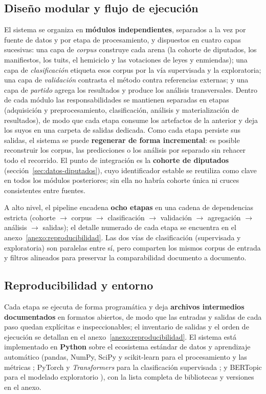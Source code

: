 \subsection{Diseño modular y flujo de ejecución}
\label{sec:arq-modular}

El sistema se organiza en \textbf{módulos independientes}, separados a la vez por
fuente de datos y por etapa de procesamiento, y dispuestos en cuatro capas
sucesivas: una capa de \emph{corpus} construye cada arena (la cohorte de
diputados, los manifiestos, los tuits, el hemiciclo y las votaciones de leyes y
enmiendas); una capa de \emph{clasificación} etiqueta esos corpus por la vía
supervisada y la exploratoria; una capa de \emph{validación} contrasta el método
contra referencias externas; y una capa de \emph{partido} agrega los resultados y
produce los análisis transversales. Dentro de cada módulo las responsabilidades
se mantienen separadas en etapas (adquisición y preprocesamiento, clasificación,
análisis y materialización de resultados), de modo que cada etapa consume los
artefactos de la anterior y deja los suyos en una carpeta de salidas dedicada.
Como cada etapa persiste sus salidas, el sistema se puede \textbf{regenerar de
forma incremental}: es posible reconstruir los corpus, las predicciones o los
análisis por separado sin rehacer todo el recorrido. El punto de integración es
la \textbf{cohorte de diputados} (sección~\ref{sec:datos-diputados}), cuyo
identificador estable se reutiliza como clave en todos los módulos posteriores;
sin ella no habría cohorte única ni cruces consistentes entre fuentes.

A alto nivel, el pipeline encadena \textbf{ocho etapas} en una cadena de
dependencias estricta (cohorte $\rightarrow$ corpus $\rightarrow$ clasificación
$\rightarrow$ validación $\rightarrow$ agregación $\rightarrow$ análisis
$\rightarrow$ salidas); el detalle numerado de cada etapa se encuentra en el
anexo~\ref{anexo:reproducibilidad}. Las dos vías de clasificación (supervisada
y exploratoria) son paralelas entre sí, pero comparten los mismos corpus de
entrada y filtros alineados para preservar la comparabilidad documento a
documento.

\subsection{Reproducibilidad y entorno}
\label{sec:arq-reproducibilidad}

Cada etapa se ejecuta de forma programática y deja \textbf{archivos intermedios
documentados} en formatos abiertos, de modo que las entradas y salidas de cada
paso quedan explícitas e inspeccionables; el inventario de salidas y el orden de
ejecución se detallan en el anexo~\ref{anexo:reproducibilidad}. El sistema está
implementado en \textbf{Python} sobre el ecosistema estándar de datos y
aprendizaje automático (pandas, NumPy, SciPy y scikit-learn para el
procesamiento y las métricas
\cite{mckinney2010pandas, harris2020numpy, virtanen2020scipy, pedregosa2011scikit};
PyTorch y \emph{Transformers} para la clasificación supervisada
\cite{paszke2019pytorch, wolf2020transformers}; y BERTopic para el modelado
exploratorio \cite{grootendorst2022bertopic}), con la lista completa de
bibliotecas y versiones en el anexo.

